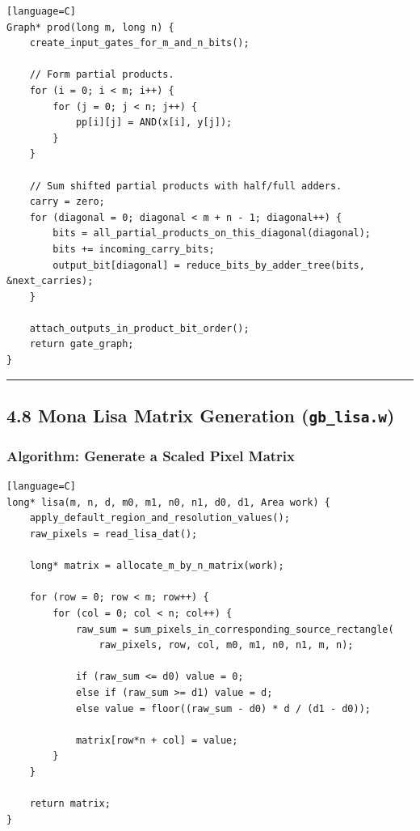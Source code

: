 \documentclass[11pt]{article}
\begin{document}
\begin{verbatim}[language=C]
Graph* prod(long m, long n) {
    create_input_gates_for_m_and_n_bits();

    // Form partial products.
    for (i = 0; i < m; i++) {
        for (j = 0; j < n; j++) {
            pp[i][j] = AND(x[i], y[j]);
        }
    }

    // Sum shifted partial products with half/full adders.
    carry = zero;
    for (diagonal = 0; diagonal < m + n - 1; diagonal++) {
        bits = all_partial_products_on_this_diagonal(diagonal);
        bits += incoming_carry_bits;
        output_bit[diagonal] = reduce_bits_by_adder_tree(bits, &next_carries);
    }

    attach_outputs_in_product_bit_order();
    return gate_graph;
}
\end{verbatim}

\begin{center}\rule{0.5\linewidth}{0.5pt}\end{center}

\subsection{\texorpdfstring{4.8 Mona Lisa Matrix Generation (\texttt{gb\_lisa.w})}{4.8 Mona Lisa Matrix Generation (gb\_lisa.w)}}\label{mona-lisa-matrix-generation-gb_lisa.w}

\subsubsection{Algorithm: Generate a Scaled Pixel Matrix}\label{algorithm-generate-a-scaled-pixel-matrix}

\begin{verbatim}[language=C]
long* lisa(m, n, d, m0, m1, n0, n1, d0, d1, Area work) {
    apply_default_region_and_resolution_values();
    raw_pixels = read_lisa_dat();

    long* matrix = allocate_m_by_n_matrix(work);

    for (row = 0; row < m; row++) {
        for (col = 0; col < n; col++) {
            raw_sum = sum_pixels_in_corresponding_source_rectangle(
                raw_pixels, row, col, m0, m1, n0, n1, m, n);

            if (raw_sum <= d0) value = 0;
            else if (raw_sum >= d1) value = d;
            else value = floor((raw_sum - d0) * d / (d1 - d0));

            matrix[row*n + col] = value;
        }
    }

    return matrix;
}
\end{verbatim}
\end{document}
